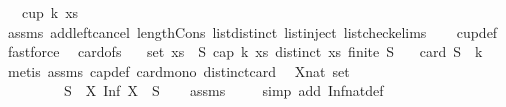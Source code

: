 \begin{isabellebody}
\ \ \ {\isachardoublequoteopen}cup\ k\ xs{\isachardoublequoteclose}\isanewline
%
\isadelimproof
\ \ %
\endisadelimproof
%
\isatagproof
{}\isamarkupfalse%
\ assms\ add{\isacharunderscore}{\kern0pt}left{\isacharunderscore}{\kern0pt}cancel\ length{\isacharunderscore}{\kern0pt}Cons\ list{\isachardot}{\kern0pt}distinct{\isacharparenleft}{\kern0pt}{}{\isacharparenright}{\kern0pt}\ list{\isachardot}{\kern0pt}inject\ list{\isacharunderscore}{\kern0pt}check{\isachardot}{\kern0pt}elims{\isacharparenleft}{\kern0pt}{}{\isacharparenright}{\kern0pt}\isanewline
\ \ \isamarkupfalse%
\ cup{\isacharunderscore}{\kern0pt}def\ \isamarkupfalse%
\ fastforce%
\endisatagproof
{\isafoldproof}%
%
\isadelimproof
\isanewline
%
\endisadelimproof
\isanewline
{}\isamarkupfalse%
\ \ card{\isacharunderscore}{\kern0pt}of{\isacharunderscore}{\kern0pt}s{\isacharcolon}{\kern0pt}\isanewline
\ \ \ {\isachardoublequoteopen}set\ xs\ {\isasymsubseteq}\ S{\isachardoublequoteclose}\ {\isachardoublequoteopen}cap\ k\ xs{\isachardoublequoteclose}\ {\isachardoublequoteopen}distinct\ xs{\isachardoublequoteclose}\ {\isachardoublequoteopen}finite\ S{\isachardoublequoteclose}\isanewline
\ \ \ {\isachardoublequoteopen}card\ S\ {\isasymge}\ k{\isachardoublequoteclose}\isanewline
%
\isadelimproof
\ \ %
\endisadelimproof
%
\isatagproof
{}\isamarkupfalse%
\ {\isacharparenleft}{\kern0pt}metis\ assms\ cap{\isacharunderscore}{\kern0pt}def\ card{\isacharunderscore}{\kern0pt}mono\ distinct{\isacharunderscore}{\kern0pt}card{\isacharparenright}{\kern0pt}%
\endisatagproof
{\isafoldproof}%
%
\isadelimproof
\isanewline
%
\endisadelimproof
\isanewline
{}\isamarkupfalse%
\ \ {\isachardoublequoteopen}{\isacharparenleft}{\kern0pt}X{\isacharcolon}{\kern0pt}{\isacharcolon}{\kern0pt}nat\ set{\isacharparenright}{\kern0pt}\ {\isasymnoteq}\ {\isacharbraceleft}{\kern0pt}{\isacharbraceright}{\kern0pt}{\isachardoublequoteclose}\ \isanewline
\ \ \ \ \ \ \ \ \ {\isachardoublequoteopen}{\isasymexists}S\ {\isasymin}\ X{\isachardot}{\kern0pt}\ Inf\ X\ {\isacharequal}{\kern0pt}\ S{\isachardoublequoteclose}\isanewline
%
\isadelimproof
\ \ %
\endisadelimproof
%
\isatagproof
{}\isamarkupfalse%
\ assms\ \isanewline
\ \ \isamarkupfalse%
\ {\isacharparenleft}{\kern0pt}simp\ add{\isacharcolon}{\kern0pt}\ Inf{\isacharunderscore}{\kern0pt}nat{\isacharunderscore}{\kern0pt}def{}{\isacharparenright}{\kern0pt}%

\end{isabellebody}
